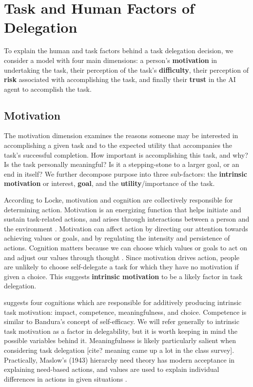 \documentclass[letterpaper]{article} %
\begin{document}
\section{Task and Human Factors of Delegation}
To explain the human and task factors behind a task delegation decision, we consider a model with four main dimensions: a person's \textbf{motivation} in undertaking the task, their perception of the task's \textbf{difficulty}, their perception of \textbf{risk} associated with accomplishing the task, and finally their \textbf{trust} in the AI agent to accomplish the task. 



\subsection{Motivation}
The motivation dimension examines the reasons someone may be interested in accomplishing a given task and to the expected utility that accompanies the task's successful completion. How important is accomplishing this task, and why? Is the task personally meaningful? Is it a stepping-stone to a larger goal, or an end in itself? We further decompose purpose into three sub-factors: the \textbf{intrinsic motivation} or interest, \textbf{goal}, and the \textbf{utility}/importance of the task.

According to Locke, motivation and cognition are collectively responsible for determining action. Motivation is an energizing function that helps initiate and sustain task-related actions, and arises through interactions between a person and the environment \cite{latham2005work}. Motivation can affect action by directing our attention towards achieving values or goals, and by regulating the intensity and persistence of actions. Cognition matters because we can choose which values or goals to act on and adjust our values through thought \cite{Locke-motivation-2000}. Since motivation drives action, people are unlikely to choose self-delegate a task for which they have no motivation if given a choice. This suggests \textbf{intrinsic motivation} to be a likely factor in task delegation.

\cite{thomas-intrinsic-motiv} suggests four cognitions which are responsible for additively producing intrinsic task motivation: impact, competence, meaningfulness, and choice. Competence is similar to Bandura's concept of self-efficacy. We will refer generally to intrinsic task motivation as a factor in delegability, but it is worth keeping in mind the possible variables behind it. Meaningfulness is likely particularly salient when considering task delegation [cite? meaning came up a lot in the class survey]. Practically, Maslow's (1943) hierarchy need theory has modern acceptance in explaining need-based actions, and values are used to explain individual differences in actions in given situations \cite{latham2005work}.
\end{document}

